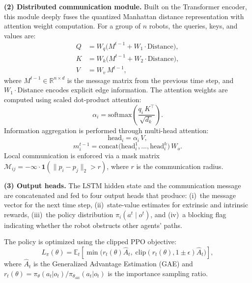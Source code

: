 \documentclass[conference]{IEEEtran}
\begin{document}
\textbf{(2) Distributed communication module.}
Built on the Transformer encoder, this module deeply fuses the
quantized Manhattan distance representation with attention weight
computation.
For a group of $n$ robots, the queries, keys, and values are:
\begin{align}
  Q &= W_q\bigl(M^{t-1} + W_1 \cdot \mathrm{Distance}\bigr),
      \label{eq:Q} \\
  K &= W_k\bigl(M^{t-1} + W_2 \cdot \mathrm{Distance}\bigr),
      \label{eq:K} \\
  V &= W_v\, M^{t-1}, \label{eq:V}
\end{align}
where $M^{t-1}\in\mathbb{R}^{n\times d}$ is the message matrix
from the previous time step, and
$W_1\cdot\mathrm{Distance}$ encodes explicit edge information.
The attention weights are computed using scaled dot-product
attention:
\begin{equation}\label{eq:attn_weight}
  \alpha_i = \mathrm{softmax}\!\left(
    \frac{q_i\, K^\top}{\sqrt{d_k}}\right).
\end{equation}
Information aggregation is performed through multi-head attention:
\begin{equation}\label{eq:head}
  \mathrm{head}_i = \alpha_i\, V,
\end{equation}
\begin{equation}\label{eq:msg}
  m_i^{t-1} = \mathrm{concat}\!\bigl(
    \mathrm{head}_i^1, \ldots, \mathrm{head}_i^h\bigr)\, W_o.
\end{equation}
Local communication is enforced via a mask matrix
$\mathcal{M}_{ij}=-\infty \cdot \mathbf{1}(\|p_i-p_j\|_2 > r)$,
where $r$ is the communication radius.

\textbf{(3) Output heads.}
The LSTM hidden state and the communication message are
concatenated and fed to four output heads that produce:
(i)~the message vector for the next time step,
(ii)~state-value estimates for extrinsic and intrinsic rewards,
(iii)~the policy distribution
$\pi_i(a^t \mid o^t)$, and
(iv)~a blocking flag indicating whether the robot obstructs
other agents' paths.

The policy is optimized using the clipped PPO objective:
\begin{equation}\label{eq:ppo}
  L_\pi(\theta) = \mathbb{E}_t\!\left[\min\!\bigl(
    r_t(\theta)\hat{A}_t,\;
    \mathrm{clip}(r_t(\theta), 1\!\pm\!\epsilon)\hat{A}_t
  \bigr)\right],
\end{equation}
where $\hat{A}_t$ is the Generalized Advantage Estimation (GAE)
and $r_t(\theta)=\pi_\theta(a_t|o_t)/\pi_{\theta_{\mathrm{old}}}
(a_t|o_t)$ is the importance sampling ratio.
\end{document}
